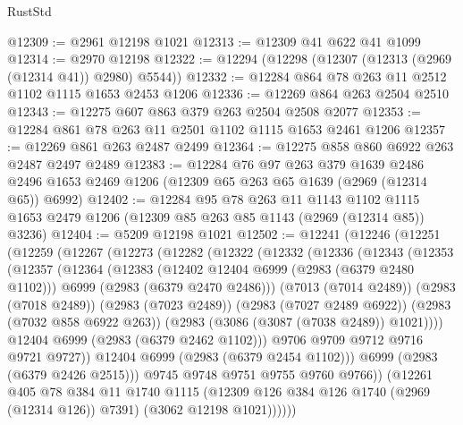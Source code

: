 \begin{lexlean}{RustStd}
\begin{coremodule}
@12309 := @2961 @12198 @1021
@12313 := @12309 @41 @622 @41 @1099
@12314 := @2970 @12198
@12322 := @12294 (@12298 (@12307 (@12313 (@2969 (@12314 @41)) @2980) @5544))
@12332 := @12284 @864 @78 @263 @11 @2512 @1102 @1115 @1653 @2453 @1206
@12336 := @12269 @864 @263 @2504 @2510
@12343 := @12275 @607 @863 @379 @263 @2504 @2508 @2077
@12353 := @12284 @861 @78 @263 @11 @2501 @1102 @1115 @1653 @2461 @1206
@12357 := @12269 @861 @263 @2487 @2499
@12364 := @12275 @858 @860 @6922 @263 @2487 @2497 @2489
@12383 := @12284
    @76
    @97
    @263
    @379
    @1639
    @2486
    @2496
    @1653
    @2469
    @1206
    (@12309 @65 @263 @65 @1639 (@2969 (@12314 @65)) @6992)
@12402 := @12284
    @95
    @78
    @263
    @11
    @1143
    @1102
    @1115
    @1653
    @2479
    @1206
    (@12309 @85 @263 @85 @1143 (@2969 (@12314 @85)) @3236)
@12404 := @5209 @12198 @1021
@12502 := @12241
    (@12246
      (@12251
        (@12259
          (@12267
            (@12273
              (@12282
                (@12322
                  (@12332
                    (@12336
                      (@12343
                        (@12353
                          (@12357
                            (@12364
                              (@12383
                                (@12402 @12404 @6999 (@2983 (@6379 @2480 @1102)))
                                @6999
                                (@2983 (@6379 @2470 @2486)))
                              (@7013 (@7014 @2489))
                              (@2983 (@7018 @2489))
                              (@2983 (@7023 @2489))
                              (@2983 (@7027 @2489 @6922))
                              (@2983 (@7032 @858 @6922 @263))
                              (@2983 (@3086 (@3087 (@7038 @2489)) @1021))))
                          @12404
                          @6999
                          (@2983 (@6379 @2462 @1102)))
                        @9706
                        @9709
                        @9712
                        @9716
                        @9721
                        @9727))
                    @12404
                    @6999
                    (@2983 (@6379 @2454 @1102)))
                  @6999
                  (@2983 (@6379 @2426 @2515)))
                @9745
                @9748
                @9751
                @9755
                @9760
                @9766))
            (@12261
              @405
              @78
              @384
              @11
              @1740
              @1115
              (@12309 @126 @384 @126 @1740 (@2969 (@12314 @126)) @7391)
              (@3062 @12198 @1021))))))

\end{coremodule}
\end{lexlean}
